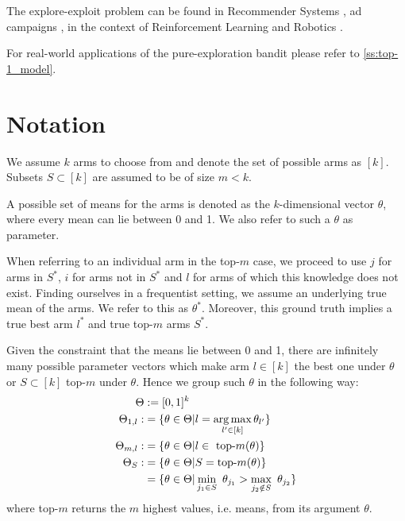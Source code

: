 The explore-exploit problem can be found in Recommender Systems \cite{McInerney:2018:EEE:3240323.3240354}, ad campaigns \cite{5360225},
in the context of Reinforcement Learning
\cite{DBLP:journals/corr/abs-1811-12560} \cite{Szepesvari:2010:ARL:1855083} and
Robotics \cite{Baldassano}.

For real-world applications of the pure-exploration bandit please refer to
\ref{ss:top-1_model}.

\section{Notation}\label{section:notation}
We assume $k$ arms to choose from and denote the set of possible arms as $[k]$.
Subsets $S \subset [k]$ are assumed to be of size $m < k$.

A possible set of means for the arms is denoted as the $k$-dimensional vector
$\theta$, where every mean can lie between 0 and 1. We also refer to such a
$\theta$ as parameter.

When referring to an individual arm in the top-$m$ case, we proceed to use $j$
for arms in $S^*$, $i$ for arms not in $S^*$ and $l$ for arms of which this
knowledge does not exist. Finding ourselves in a frequentist setting, we assume
an underlying true mean of the arms. We refer to this as $\theta^*$. Moreover,
this ground truth implies a true best arm $l^*$ and true top-$m$ arms $S^*$.

Given the constraint that the means lie between 0 and 1, there are infinitely
many possible parameter vectors which make arm $l \in [k]$ the best one under
$\theta$ or $S \subset [k]$ top-$m$ under $\theta$. Hence we group such $\theta$
in the following way:
\begin{align}
  \Theta &:= [0, 1]^k \\
  \Theta_{1, l} :&= \{\theta \in \Theta | l = \operatorname*{arg\,max}_{l' \in [k]}
      \theta_{l'}\} \\
  \Theta_{m, l} :&= \{\theta \in \Theta | l \in \text{ top-}m(\theta)\} \\
  \Theta_S :&= \{\theta \in \Theta | S = \text{top-}m(\theta)\} \\
    &= \{ \theta \in \Theta| \min_{j_1 \in S}\ \theta_{j_1} > \max_{j_2 \notin
      S}\ \theta_{j_2}\}
\end{align}
where top-$m$ returns the $m$ highest values, i.e. means, from its argument
$\theta$.

